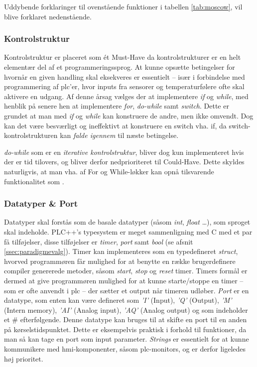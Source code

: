 \noindent Uddybende forklaringer til ovenstående funktioner i tabellen \ref{tab:moscow}, vil blive forklaret nedenstående. 

\subsubsection{Kontrolstruktur}
Kontrolstruktur er placeret som ét Must-Have da kontrolstrukturer er en helt elementær del af et programmeringssprog. At kunne opsætte betingelser for hvornår en given handling skal eksekveres er essentielt – især i forbindelse med programmering af \gls{plc}'er, hvor inputs fra sensorer og temperaturfølere ofte skal aktivere en udgang. 
Af denne årsag vælges der at implementere \textit{if} og \textit{while}, med henblik på senere hen at implementere \textit{for}, \textit{do-while} samt \textit{switch}. Dette er grundet at man med \textit{if} og \textit{while} kan konstruere de andre, men ikke omvendt. Dog kan det være besværligt og ineffektivt at konstruere en switch vha. if, da switch-kontrolstrukturen kan \textit{falde igennem} til næste betingelse.

\textit{do-while} som er en \textit{iterative kontrolstruktur}, bliver dog kun implementeret hvis der er tid tilovers, og bliver derfor nedprioriteret til Could-Have. Dette skyldes naturligvis, at man vha. af For og While-løkker kan opnå tilsvarende funktionalitet som .

\subsubsection{Datatyper \& Port}
\label{subsec:datatyper}
Datatyper skal forstås som de basale datatyper (såsom \textit{int}, \textit{float} …), som sproget skal indeholde. PLC++'s typesystem er meget sammenligning med C med et par få tilføjelser, disse tilføjelser er \textit{timer}, \textit{port} samt \textit{bool} (se afsnit \ref{ssec:paradigmevalg}).
Timer kan implementeres som en typedefineret \textit{struct}, hvorved programmøren får mulighed for at benytte en række brugerdefinere compiler genererede metoder, såsom \textit{start}, \textit{stop} og \textit{reset} timer. Timers formål er dermed at give programmøren mulighed for at kunne starte/stoppe en timer – som er ofte anvendt i \gls{plc} – der sætter et output når timeren udløber.
\textit{Port} er en datatype, som enten kan være defineret som \textit{'I'} (Input), \textit{'Q'} (Output), \textit{'M'} (Intern memory), \textit{'AI'} (Analog input), \textit{'AQ'} (Analog output) og som indeholder et \# efterfølgende. Denne datatype kan bruges til at skifte en port til en anden på kørselstidspunktet. Dette er eksempelvis praktisk i forhold til funktioner, da man så kan tage en port som input parameter.
\textit{Strings} er essentielt for at kunne kommunikere med \gls{hmi}-komponenter, såsom \gls{plc}-monitors, og er derfor ligeledes høj prioritet. 

